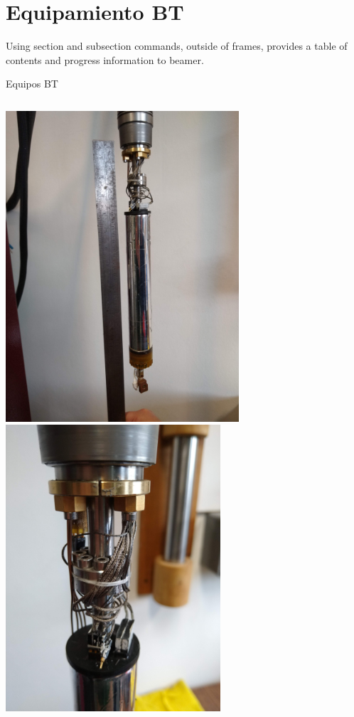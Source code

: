 \documentclass[ignorenonframetext,12pt]{beamer}
\begin{document}
\section{Equipamiento BT}
Using section and subsection commands, outside of frames, provides a table of contents and progress information to beamer.
\begin{frame}{Equipos BT}
				\begin{columns}
								\begin{column}{0.45\textwidth}
												\includegraphics[angle=-90,width=0.65\textwidth]{IMG_20190523_105037648} \\ 
												\includegraphics[angle=-90,width=0.6\textwidth]{IMG_20190523_105054061}

\end{column}
\end{columns}
\end{frame}
\end{document}
